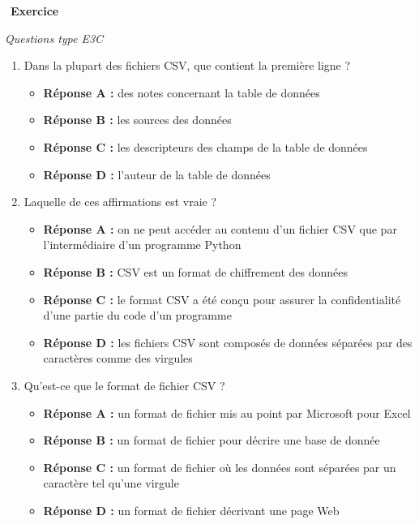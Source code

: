 \documentclass[
  11pt,
]{article}
\providecommand{\tightlist}{%
  \setlength{\itemsep}{0pt}\setlength{\parskip}{0pt}}
\newcounter{exo}
\newenvironment{exercice}[1]
{\par \medskip   \addtocounter{exo}{1} \noindent  
\begin{bclogo}[arrondi =0.1,   noborder = true, logo=\bccrayon, marge=4]{~\textbf{Exercice} \textbf{\theexo} {\itshape #1} }  \par}
{
\end{bclogo}
 \par \bigskip }
\newcounter{def}
\newcounter{prog}
\begin{document}
\begin{exercice}{}

\emph{Questions type E3C}

\begin{enumerate}
\def\labelenumi{\arabic{enumi}.}
\tightlist
\item
  Dans la plupart des fichiers CSV, que contient la première ligne ?

  \begin{itemize}
  \tightlist
  \item
    \textbf{Réponse A :} des notes concernant la table de données\\
  \item
    \textbf{Réponse B :} les sources des données\\
  \item
    \textbf{Réponse C :} les descripteurs des champs de la table de
    données\\
  \item
    \textbf{Réponse D :} l'auteur de la table de données
  \end{itemize}
\item
  Laquelle de ces affirmations est vraie ?

  \begin{itemize}
  \tightlist
  \item
    \textbf{Réponse A :} on ne peut accéder au contenu d'un fichier CSV
    que par l'intermédiaire d'un programme Python
  \item
    \textbf{Réponse B :} CSV est un format de chiffrement des données\\
  \item
    \textbf{Réponse C :} le format CSV a été conçu pour assurer la
    confidentialité d'une partie du code d'un programme
  \item
    \textbf{Réponse D :} les fichiers CSV sont composés de données
    séparées par des caractères comme des virgules
  \end{itemize}
\item
  Qu'est-ce que le format de fichier CSV ?

  \begin{itemize}
  \tightlist
  \item
    \textbf{Réponse A :} un format de fichier mis au point par Microsoft
    pour Excel
  \item
    \textbf{Réponse B :} un format de fichier pour décrire une base de
    donnée\\
  \item
    \textbf{Réponse C :} un format de fichier où les données sont
    séparées par un caractère tel qu'une virgule
  \item
    \textbf{Réponse D :} un format de fichier décrivant une page Web
  \end{itemize}
\end{enumerate}

\end{exercice}
\end{document}

